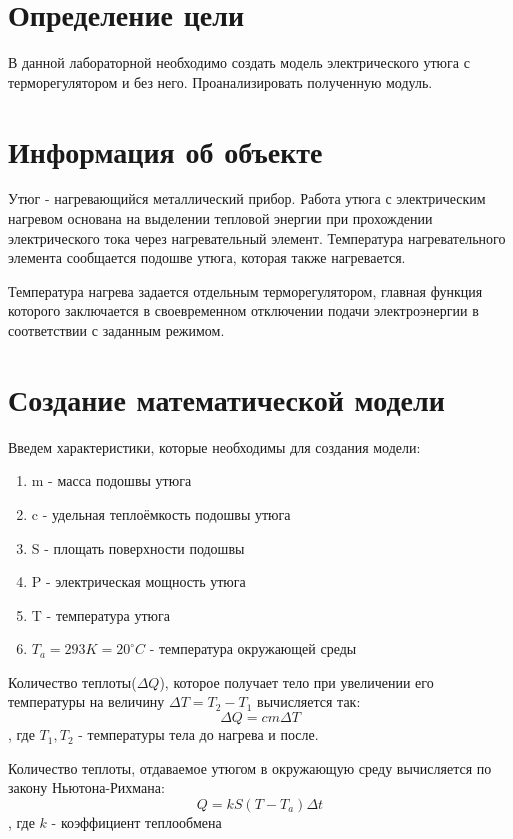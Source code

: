 \documentclass[a4paper, 14pt]{extarticle}
\begin{document}
	\pagebreak	

	\section{Определение цели}
		В данной лабораторной необходимо создать модель электрического утюга с терморегулятором и без него.
		Проанализировать полученную модуль.

	\section{Информация об объекте}
		Утюг - нагревающийся металлический прибор. Работа утюга с электрическим нагревом основана на выделении тепловой энергии при прохождении электрического тока через нагревательный элемент. Температура нагревательного элемента сообщается подошве утюга, которая также нагревается.
		
		Температура нагрева задается отдельным терморегулятором, главная функция которого заключается в своевременном отключении подачи электроэнергии в соответствии с заданным режимом.

	\section{Создание математической модели}
		Введем характеристики, которые необходимы для создания модели:
		\begin{enumerate}[leftmargin=3\parindent, itemsep=0mm]
			\item m - масса подошвы утюга
			\item c - удельная теплоёмкость подошвы утюга
			\item S - площать поверхности подошвы
			\item P - электрическая мощность утюга
			\item T - температура утюга
			\item $T_a = 293K = 20^{\circ}C$ - температура окружающей среды
		\end{enumerate}
	
		Количество теплоты(\(\Delta Q\)), которое получает тело при увеличении его температуры на величину 
		\( \Delta T = T_2 - T_1 \) вычисляется так:
		\[ \Delta Q = cm \Delta T \], где \( T_1, T_2\) - температуры тела до нагрева и после.
		
		Количество теплоты, отдаваемое утюгом в окружающую среду вычисляется по закону Ньютона-Рихмана:
		\[ Q = kS(T-T_a) \Delta t \]
		, где \(k\) - коэффициент теплообмена
			
\end{document}
